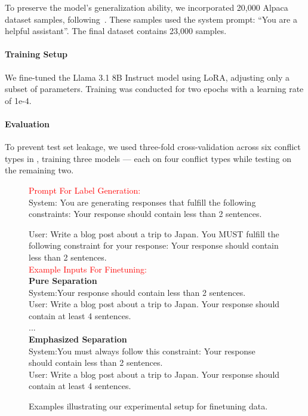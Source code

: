 To preserve the model’s generalization ability, we incorporated 20,000 Alpaca dataset samples, following~\citep{bianchi2024safetytunedllamaslessonsimproving}. These samples used the system prompt: ``You are a helpful assistant''. The final dataset contains 23,000 samples. 

\paragraph{Training Setup}
We fine-tuned the Llama 3.1 8B Instruct model using LoRA, adjusting only a subset of parameters. Training was conducted for two epochs with a learning rate of 1e-4.

\paragraph{Evaluation}
\label{sec:finetuning_evaluation}
To prevent test set leakage, we used three-fold cross-validation across six conflict types in , training three models — each on four conflict types while testing on the remaining two.

\begin{figure*}[h]
	\small
	\begin{tcolorbox}[colframe=white, left=3mm, right=3mm]
\textcolor{red}{Prompt For Label Generation:} \\
\textcolor{mycolor}{System:} You are generating responses that fulfill the following constraints: Your response should contain less than 2 sentences.

\textcolor{mycolor}{User:} {Write a blog post about a trip to Japan. You MUST fulfill the following constraint for your response: Your response should contain less than 2 sentences.} \\

\textcolor{red}{Example Inputs For Finetuning:} \\
\small
\textbf{Pure Separation} \\
\textcolor{mycolor}{System:}Your response should contain less than 2 sentences. \\
\textcolor{mycolor}{User:} {Write a blog post about a trip to Japan. Your response should contain at least 4 sentences.} \\
...\\

\textbf{Emphasized Separation} \\
\textcolor{mycolor}{System:}You must always follow this constraint:  Your response should contain less than 2 sentences. \\
\textcolor{mycolor}{User:} {Write a blog post about a trip to Japan. Your response should contain at least 4 sentences.} \\
	\end{tcolorbox}
	\caption{Examples illustrating our experimental setup for finetuning data.}
    \label{fig:examples_finetuning}
\end{figure*}